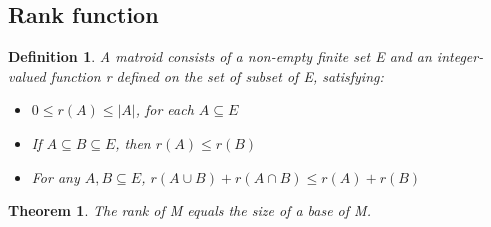 \documentclass[a4paper, 11pt]{report}
\newtheorem{definition}{Definition}
\newtheorem{theorem}{Theorem}
\theoremstyle{remark}
\begin{document}
\subsection{Rank function}
    \begin{definition}
        A matroid consists of a non-empty finite set E and an integer-valued function r defined on the set of subset of E, satisfying:        
        \begin{itemize}
            \item[i] $0\leq r(A)\leq |A|$, for each $A\subseteq E$ 
            \item[ii] If $A\subseteq B\subseteq E$, then $r(A) \leq r(B)$
            \item[iii] For any $A,B\subseteq E$, $r(A\cup B) + r(A\cap B)\leq r(A) + r(B)$
        \end{itemize}
    \end{definition}
    \begin{theorem}
        The rank of M equals the size of a base of M.
    \end{theorem}
\end{document}
